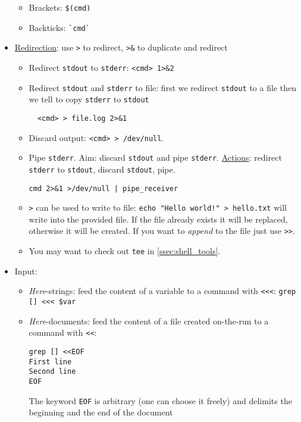 \documentclass[a4paper,12pt,%
              final%
              ]{article}
\begin{document}
\begin{itemize}
    \begin{itemize}
      \item Brackets: \verb|$(cmd)|
      \item Backticks: \verb|`cmd`|
    \end{itemize}
  \item \href{https://www.gnu.org/software/bash/manual/bash.html#Redirections}{Redirection}: use \verb|>| to redirect, \verb|>&| to duplicate and redirect
    \begin{itemize}
      \item Redirect \texttt{stdout} to \texttt{stderr}: \verb|<cmd> 1>&2|
      \item Redirect \texttt{stdout} and \texttt{stderr} to file: first we redirect \texttt{stdout} to a file then we tell to copy \texttt{stderr} to \texttt{stdout}
\begin{verbatim}
  <cmd> > file.log 2>&1
\end{verbatim}
      \item Discard output: \texttt{<cmd> > /dev/null}.
      \item Pipe \texttt{stderr}. Aim: discard \texttt{stdout} and pipe \texttt{stderr}. \href{https://stackoverflow.com/questions/2342826/how-can-i-pipe-stderr-and-not-stdout}{Actions}: redirect \texttt{stderr} to \texttt{stdout}, discard \texttt{stdout}, pipe.
\begin{verbatim}
cmd 2>&1 >/dev/null | pipe_receiver
\end{verbatim}
      \item \verb|>| can be used to write to file: \verb|echo "Hello world!" > hello.txt| will write into the provided file. If the file already exists it will be replaced, otherwise it will be created. If you want to \emph{append} to the file just use \verb|>>|.
      \item You may want to check out \texttt{tee} in \ref{ssec:shell_tools}.
    \end{itemize}
  \item Input:
    \begin{itemize}
      \item \emph{Here}-strings: feed the content of a variable to a command with \verb|<<<|: \verb|grep [] <<< $var|
      \item \emph{Here}-documents: feed the content of a file created on-the-run to a command with  \verb|<<|:
\begin{verbatim}
grep [] <<EOF
First line
Second line
EOF
\end{verbatim}
        The keyword \texttt{EOF} is arbitrary (one can choose it freely) and delimits the beginning and the end of the document

\end{itemize}
\end{itemize}
\end{document}
